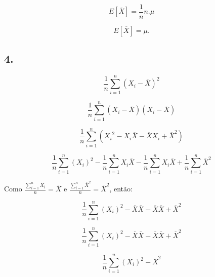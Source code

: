 \documentclass[hidelinks,11pt]{book}
\theoremstyle{definition}
\begin{document}
\begin{displaymath}
	E[\overline{X}] = \frac{1}{n}n.\mu
\end{displaymath}


\begin{displaymath}
	E[\overline{X}] = \mu.
\end{displaymath}



	
	\subsection*{4.}

\begin{displaymath}
	\frac{1}{n} \sum_{i = 1}^{n} (X_i - \overline{X})^2
\end{displaymath}

\begin{displaymath}
	\frac{1}{n} \sum_{i = 1}^{n} (X_i - \overline{X})(X_i - \overline{X})
\end{displaymath}

\begin{displaymath}
	\frac{1}{n} \sum_{i = 1}^{n} ({X_i}^2 - X_i\overline{X} -\overline{X} X_i + {\overline{X}}^2)
\end{displaymath}

\begin{displaymath}
	\frac{1}{n} \sum_{i = 1}^{n} ({X_i})^2 - \frac{1}{n} \sum_{i = 1}^{n}X_i\overline{X} - \frac{1}{n} \sum_{i = 1}^{n}X_i\overline{X} + \frac{1}{n} \sum_{i = 1}^{n}{\overline{X}}^2
\end{displaymath}

\vspace{2em}

Como $\frac{\sum_{i = 1}^{n} X_i}{n}=\overline{X}$ e $\frac{\sum_{i = 1}^{n}\overline{X}^2}{n}=\overline{X}^2$, então:


\begin{displaymath}
	\frac{1}{n} \sum_{i = 1}^{n} ({X_i})^2 - \overline{X}\overline{X} -\overline{X}\overline{X}  +  \overline{X}^2
\end{displaymath}

\begin{displaymath}
	\frac{1}{n} \sum_{i = 1}^{n} ({X_i})^2 - \overline{X}\overline{X} -\overline{X}\overline{X}  +  \overline{X}^2
\end{displaymath}

\begin{displaymath}
	\frac{1}{n} \sum_{i = 1}^{n} ({X_i})^2 -   \overline{X}^2
\end{displaymath}
\end{document}
